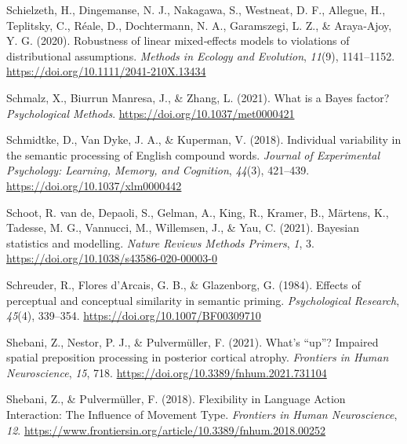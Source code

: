 \documentclass[
  12pt,
  man,floatsintext]{apa7}
\newlength{\cslhangindent}
\newlength{\cslentryspacingunit} %
\newenvironment{CSLReferences}[2] %
 {%
  \setlength{\parindent}{0pt}
  \ifodd #1
  \let\oldpar\par
  \def\par{\hangindent=\cslhangindent\oldpar}
  \fi
  \setlength{\parskip}{#2\cslentryspacingunit}
 }%
 {}
\begin{document}
\begin{CSLReferences}{1}{0}
\leavevmode{}%
Schielzeth, H., Dingemanse, N. J., Nakagawa, S., Westneat, D. F., Allegue, H., Teplitsky, C., Réale, D., Dochtermann, N. A., Garamszegi, L. Z., \& Araya‐Ajoy, Y. G. (2020). Robustness of linear mixed‐effects models to violations of distributional assumptions. \emph{Methods in Ecology and Evolution}, \emph{11}(9), 1141--1152. \url{https://doi.org/10.1111/2041-210X.13434}

\leavevmode{}%
Schmalz, X., Biurrun Manresa, J., \& Zhang, L. (2021). What is a {Bayes} factor? \emph{Psychological Methods}. \url{https://doi.org/10.1037/met0000421}

\leavevmode{}%
Schmidtke, D., Van Dyke, J. A., \& Kuperman, V. (2018). Individual variability in the semantic processing of {English} compound words. \emph{Journal of Experimental Psychology: Learning, Memory, and Cognition}, \emph{44}(3), 421--439. \url{https://doi.org/10.1037/xlm0000442}

\leavevmode{}%
Schoot, R. van de, Depaoli, S., Gelman, A., King, R., Kramer, B., Märtens, K., Tadesse, M. G., Vannucci, M., Willemsen, J., \& Yau, C. (2021). Bayesian statistics and modelling. \emph{Nature Reviews Methods Primers}, \emph{1}, 3. \url{https://doi.org/10.1038/s43586-020-00003-0}

\leavevmode{}%
Schreuder, R., Flores d'Arcais, G. B., \& Glazenborg, G. (1984). Effects of perceptual and conceptual similarity in semantic priming. \emph{Psychological Research}, \emph{45}(4), 339--354. \url{https://doi.org/10.1007/BF00309710}

\leavevmode{}%
Shebani, Z., Nestor, P. J., \& Pulvermüller, F. (2021). What's {``up''}? {Impaired} spatial preposition processing in posterior cortical atrophy. \emph{Frontiers in Human Neuroscience}, \emph{15}, 718. \url{https://doi.org/10.3389/fnhum.2021.731104}

\leavevmode{}%
Shebani, Z., \& Pulvermüller, F. (2018). Flexibility in {Language Action Interaction}: {The Influence} of {Movement Type}. \emph{Frontiers in Human Neuroscience}, \emph{12}. \url{https://www.frontiersin.org/article/10.3389/fnhum.2018.00252}


\end{CSLReferences}
\end{document}
